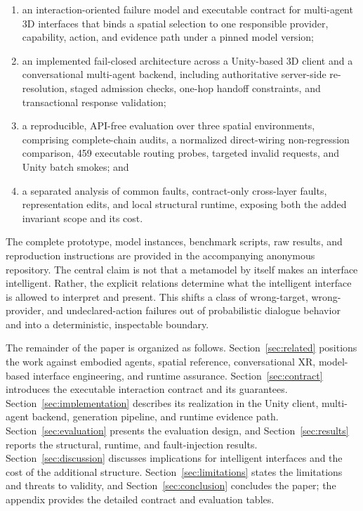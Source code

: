 \begin{enumerate}
  \item an interaction-oriented failure model and executable contract for
  multi-agent 3D interfaces that binds a spatial selection to one responsible
  provider, capability, action, and evidence path under a pinned model version;
  \item an implemented fail-closed architecture across a Unity-based 3D client
  and a conversational multi-agent backend, including authoritative server-side
  re-resolution, staged admission checks, one-hop handoff constraints, and
  transactional response validation;
  \item a reproducible, API-free evaluation over three spatial environments,
  comprising complete-chain audits, a normalized direct-wiring non-regression
  comparison, 459 executable routing probes, targeted invalid requests, and
  Unity batch smokes; and
  \item a separated analysis of common faults, contract-only cross-layer
  faults, representation edits, and local structural runtime, exposing both the
  added invariant scope and its cost.
\end{enumerate}

The complete prototype, model instances, benchmark scripts, raw results, and
reproduction instructions are provided in the accompanying anonymous
repository.  The central claim is not that a metamodel by itself makes an
interface intelligent.  Rather, the explicit relations determine what the
intelligent interface is allowed to interpret and present.  This shifts a class
of wrong-target, wrong-provider, and undeclared-action failures out of
probabilistic dialogue behavior and into a deterministic, inspectable boundary.

The remainder of the paper is organized as follows.  Section~\ref{sec:related}
positions the work against embodied agents, spatial reference, conversational
XR, model-based interface engineering, and runtime assurance.  Section~\ref{sec:contract}
introduces the executable interaction contract and its guarantees.
Section~\ref{sec:implementation} describes its realization in the Unity client,
multi-agent backend, generation pipeline, and runtime evidence path.
Section~\ref{sec:evaluation} presents the evaluation design, and
Section~\ref{sec:results} reports the structural, runtime, and fault-injection
results.  Section~\ref{sec:discussion} discusses implications for intelligent
interfaces and the cost of the additional structure.
Section~\ref{sec:limitations} states the limitations and threats to validity,
and Section~\ref{sec:conclusion} concludes the paper; the appendix provides the
detailed contract and evaluation tables.
